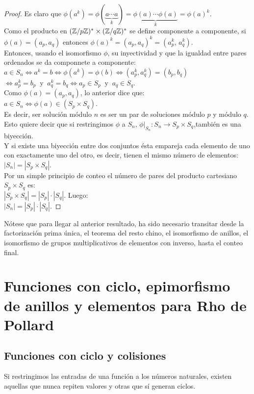 \begin{proof}
Es claro que $\phi(a^k)=\phi(\underbrace{a\cdots a}_{k})=\underbrace{\phi(a)\cdots\phi(a)}_k=\phi(a)^k$. \\
Como el producto en $(\mathbb{Z}/p\mathbb{Z})^*\times(\mathbb{Z}/q\mathbb{Z})^*$ se define componente a componente, si $\phi(a)=(a_p,a_q)$ entonces
$\phi(a)^k = (a_p,a_q)^k = (a_p^k,\,a_q^k)$. \\
Entonces, usando el isomorfismo $\phi$, su inyectividad y que la igualdad entre pares ordenados se da componnete a componente: \\
$a\in S_n \iff a^k=b \iff \phi(a^k)=\phi(b) \iff (a_p^k,a_q^k)=(b_p,b_q)$ \\
$\iff a_p^k=b_p \ \text{ y }\ a_q^k=b_q \iff a_p\in S_p \ \text{ y }\ a_q\in S_q$. \\
Como $\phi(a) = (a_p,a_q)$, lo anterior dice que: \\
$a\in S_n \iff \phi(a) \in (S_p\times S_q)$. \\
Es decir, ser solución módulo $n$ es ser un par de soluciones módulo $p$ y módulo $q$. \\
Esto quiere decir que si restringimos $\phi$ a $S_n$, $\phi\big|_{S_n}: S_n \to S_p \times S_q$,también es una biyección. \\
Y si existe una biyección entre dos conjuntos ésta empareja cada elemento de uno con exactamente uno del otro, es decir, tienen el mismo número de elementos:\\
$|S_n| = |S_p \times S_q|$. \\
Por un simple principio de conteo el número de pares del producto cartesiano $S_p \times S_q$ es: \\
$|S_p \times S_q| = |S_p| \cdot |S_q|$. Luego: \\
$|S_n| = |S_p| \cdot |S_q|$.
\end{proof}

Nótese que para llegar al anterior resultado, ha sido necesario transitar desde la factorización prima única, el teorema del resto chino, el isomorfismo de anillos, el isomorfismo de grupos multiplicativos de elementos con inverso, hasta el conteo final.

\section{Funciones con ciclo, epimorfismo de anillos y elementos para Rho de Pollard}
\label{sec:Pollard}
\subsection{Funciones con ciclo y colisiones}
Si restringimos las entradas de una función a los números naturales, existen aquellas que nunca repiten valores y otras que sí generan ciclos.

